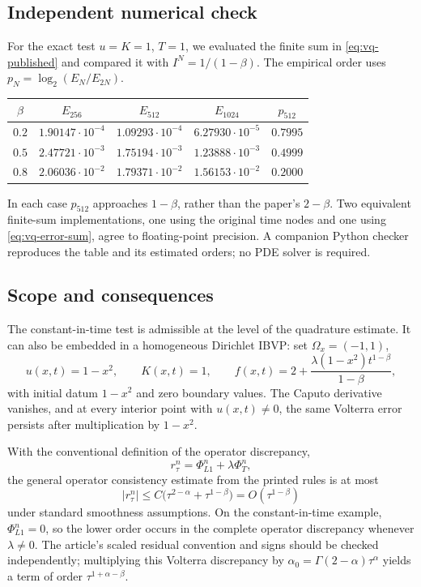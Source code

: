 \documentclass[11pt,a4paper]{amsart}
\theoremstyle{remark}
\theoremstyle{plain}
\theoremstyle{remark}
\numberwithin{equation}{section}
\begin{document}
\subsection{Independent numerical check}
For the exact test $u=K=1$, $T=1$, we evaluated the finite sum in
\eqref{eq:vq-published} and compared it with $I^N=1/(1-\beta)$.
The empirical order uses $p_N=\log_2(E_N/E_{2N})$.
\begin{center}
\small
\begin{tabular}{@{}ccccc@{}}
\hline
$\beta$ & $E_{256}$ & $E_{512}$ & $E_{1024}$ & $p_{512}$\\
\hline
$0.2$ & $1.90147\cdot10^{-4}$ & $1.09293\cdot10^{-4}$ & $6.27930\cdot10^{-5}$ & $0.7995$\\
$0.5$ & $2.47721\cdot10^{-3}$ & $1.75194\cdot10^{-3}$ & $1.23888\cdot10^{-3}$ & $0.4999$\\
$0.8$ & $2.06036\cdot10^{-2}$ & $1.79371\cdot10^{-2}$ & $1.56153\cdot10^{-2}$ & $0.2000$\\
\hline
\end{tabular}
\end{center}
In each case $p_{512}$ approaches $1-\beta$, rather than the paper's $2-\beta$.
Two equivalent finite-sum implementations, one using the original time nodes and one using \eqref{eq:vq-error-sum}, agree to floating-point precision. A companion Python checker reproduces the table and its estimated orders; no PDE solver is required.

\subsection{Scope and consequences}
The constant-in-time test is admissible at the level of the quadrature estimate. It can also be embedded in a homogeneous Dirichlet IBVP: set $\Omega_x=(-1,1)$,
\[
 u(x,t)=1-x^2,\qquad K(x,t)=1,\qquad
 f(x,t)=2+\frac{\lambda(1-x^2)t^{1-\beta}}{1-\beta},
\]
with initial datum $1-x^2$ and zero boundary values. The Caputo derivative vanishes, and at every interior point with $u(x,t)\ne0$, the same Volterra error persists after multiplication by $1-x^2$.

With the conventional definition of the operator discrepancy,
\[
 r_\tau^n=\Phi_{L1}^n+\lambda\Phi_T^n,
\]
the general operator consistency estimate from the printed rules is at most
\[
 |r_\tau^n|\le C\bigl(\tau^{2-\alpha}+\tau^{1-\beta}\bigr)
 =O(\tau^{1-\beta})
\]
under standard smoothness assumptions. On the constant-in-time example, $\Phi_{L1}^n=0$, so the lower order occurs in the complete operator discrepancy whenever $\lambda\ne0$. The article's scaled residual convention and signs should be checked independently; multiplying this Volterra discrepancy by
$\alpha_0=\Gamma(2-\alpha)\tau^\alpha$ yields a term of order
$\tau^{1+\alpha-\beta}$.
\end{document}
